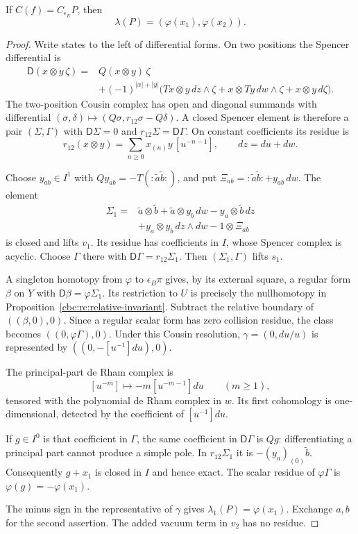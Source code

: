 \begin{lemma}\label{cbc:rc:character-reduction}
If $C(f)=C_{\epsilon_E}P$, then
\[
 \lambda(P)=(\varphi(x_1),\varphi(x_2)).
\]
\end{lemma}
\begin{proof}
Write states to the left of differential forms. On two
positions the Spencer differential is
\begin{align*}
 \mathsf D(x\otimes y\,\zeta)
  ={}&Q(x\otimes y)\,\zeta\\
  &+(-1)^{|x|+|y|}\bigl(Tx\otimes y\,dz\wedge\zeta
       +x\otimes Ty\,dw\wedge\zeta+x\otimes y\,d\zeta\bigr).
\end{align*}
The two-position Cousin complex has open and diagonal
summands with differential
$(\sigma,\delta)\mapsto(Q\sigma,r_{12}\sigma-Q\delta)$.
A closed Spencer element is therefore a pair
$(\Sigma,\Gamma)$ with
$\mathsf D\Sigma=0$ and $r_{12}\Sigma=\mathsf D\Gamma$.
On constant coefficients its residue is
\[
 r_{12}(x\otimes y)=
       \sum_{n\geq0}x_{(n)}y\,[u^{-n-1}],\qquad dz=du+dw.
\]

Choose $y_{ab}\in I^1$ with
$Qy_{ab}=-T(:\tilde a\tilde b:)$, and put
$\Xi_{ab}=: \tilde a\tilde b :+y_{ab}\,dw$.
The element
\begin{align*}
 \Sigma_1={}&\tilde a\otimes\tilde b
 +\tilde a\otimes y_b\,dw-y_a\otimes\tilde b\,dz\\
 &+y_a\otimes y_b\,dz\wedge dw-1\otimes\Xi_{ab}
\end{align*}
is closed and lifts $v_1$. Its residue has coefficients
in $I$, whose Spencer complex is acyclic. Choose
$\Gamma$ there with $\mathsf D\Gamma=r_{12}\Sigma_1$.
Then $(\Sigma_1,\Gamma)$ lifts $s_1$.

A singleton homotopy from $\varphi$ to $\epsilon_B\pi$
gives, by its external square, a regular form $\beta$
on $Y$ with $\mathsf D\beta=\varphi\Sigma_1$.
Its restriction to $U$ is precisely the nullhomotopy
in Proposition~\ref{cbc:rc:relative-invariant}.
Subtract the relative boundary of $((\beta,0),0)$.
Since a regular scalar form has zero collision residue,
the class becomes $((0,\varphi\Gamma),0)$.
Under this Cousin resolution, $\gamma=(0,du/u)$ is
represented by $((0,-[u^{-1}]du),0)$.

The principal-part de Rham complex is
\[
 [u^{-m}]\longmapsto-m[u^{-m-1}]du\qquad(m\geq1),
\]
tensored with the polynomial de Rham complex in $w$.
Its first cohomology is one-dimensional, detected by
the coefficient of $[u^{-1}]du$.

If $g\in I^0$ is
that coefficient in $\Gamma$, the same coefficient
in $\mathsf D\Gamma$ is $Qg$: differentiating a
principal part cannot produce a simple pole.
In $r_{12}\Sigma_1$ it is $-(y_a)_{(0)}\tilde b$.
Consequently $g+x_1$ is closed in $I$ and hence exact.
The scalar residue of $\varphi\Gamma$ is
$\varphi(g)=-\varphi(x_1)$.

The minus sign in the representative of $\gamma$
gives $\lambda_1(P)=\varphi(x_1)$.
Exchange $a,b$ for the second assertion. The added
vacuum term in $v_2$ has no residue.
\end{proof}

